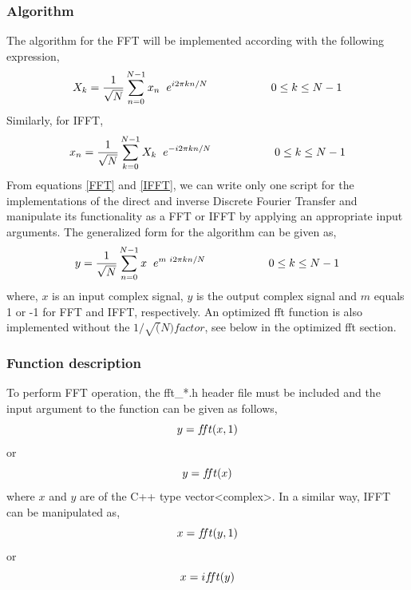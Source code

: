 \begin{refsection}
\subsubsection{Algorithm}
The algorithm for the FFT will be implemented according with the following expression,
\begin{equation}
X_k =\dfrac{1}{\sqrt{N}}\sum\limits_{n=0}^{N-1} x_n \hspace{2mm} e^{i2\pi kn/N}		\hspace{2cm}	0\leq k \leq N-1
\label{FFT}
\end{equation}
Similarly, for IFFT,
\begin{equation}
x_n =\frac{1}{\sqrt{N}} \sum\limits_{k=0}^{N-1} X_k \hspace{2mm}  e^{-i2\pi kn/N}		\hspace{2cm}	0\leq k \leq N-1
\label{IFFT}
\end{equation}
From equations \ref{FFT} and \ref{IFFT}, we can write only one script for the implementations of the direct and inverse Discrete Fourier Transfer and manipulate its functionality as a FFT or IFFT by applying an appropriate input arguments. The generalized form for the algorithm can be given as,
\begin{equation}
y =\frac{1}{\sqrt{N}} \sum\limits_{n=0}^{N-1} x \hspace{2mm}  e^{m \hspace{1mm} i2\pi kn/N}		\hspace{2cm}	0\leq k \leq N-1
\label{FT}
\end{equation}
where, $x$ is an input complex signal, $y$ is the output complex signal and $m$ equals 1 or -1 for FFT and IFFT, respectively. An optimized fft function is also implemented without the $1/\sqrt(N) factor$, see below in the optimized fft section.

\subsubsection{Function description}
To perform FFT operation, the fft\_*.h header file must be included and the input argument to the function can be given as follows,
\begin{equation*}
y=f\hspace{-0.85mm}ft(x,1)
\end{equation*}
or
\begin{equation*}
	y = f\hspace{-0.85mm}ft(x)
\end{equation*}
where $x$ and $y$ are of the C++ type vector<complex>. In a similar way, IFFT can be manipulated as,
\begin{equation*}
x = f\hspace{-0.85mm}ft(y,1)
\end{equation*}
or
\begin{equation*}
	x = if\hspace{-0.85mm}ft(y)
\end{equation*}


\end{refsection}

